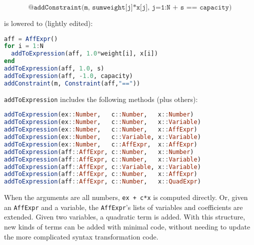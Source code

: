 \vspace{-3ex}
\[ \texttt{@addConstraint(m, sum{weight[j]*x[j], j=1:N} + s == capacity)} \]

\noindent
is lowered to (lightly edited):

\begin{singlespace}
\begin{lstlisting}[language=julia]
aff = AffExpr()
for i = 1:N
  addToExpression(aff, 1.0*weight[i], x[i])
end
addToExpression(aff, 1.0, s)
addToExpression(aff, -1.0, capacity)
addConstraint(m, Constraint(aff,"=="))
\end{lstlisting}
\end{singlespace}

\noindent
\texttt{addToExpression} includes the following methods (plus others):

\begin{samepage}
\begin{singlespace}
\begin{lstlisting}[language=julia]
addToExpression(ex::Number,   c::Number,   x::Number)
addToExpression(ex::Number,   c::Number,   x::Variable)
addToExpression(ex::Number,   c::Number,   x::AffExpr)
addToExpression(ex::Number,   c::Variable, x::Variable)
addToExpression(ex::Number,   c::AffExpr,  x::AffExpr)
addToExpression(aff::AffExpr, c::Number,   x::Number)
addToExpression(aff::AffExpr, c::Number,   x::Variable)
addToExpression(aff::AffExpr, c::Variable, x::Variable)
addToExpression(aff::AffExpr, c::Number,   x::AffExpr)
addToExpression(aff::AffExpr, c::Number,   x::QuadExpr)
\end{lstlisting}
\end{singlespace}
\end{samepage}

When the arguments are all numbers, \texttt{ex + c*x} is computed directly.
Or, given an \texttt{AffExpr} and a variable, the \texttt{AffExpr}'s lists of
variables and coefficients are extended.
Given two variables, a quadratic term is added.
With this structure, new kinds of terms can be added with minimal code,
without needing to update the more complicated syntax transformation code.

